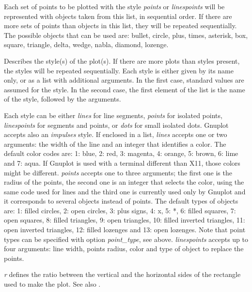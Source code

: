 \documentclass[../Maxima_Workbook.tex]{subfiles}
\begin{document}
\lz Each set of points to be plotted with the style \emph{points} or \emph{linespoints} will be represented with objects taken from this list, in sequential order. If there are more sets of points than objects in this list, they will be repeated sequentially. The possible objects that can be used are: bullet, circle, plus, times, asterisk, box, square, triangle, delta, wedge, nabla, diamond, lozenge.

\lzz {} \hfill {}

\lz Describes the style(s) of the plot(s). If there are more plots than styles present, the styles will be repeated sequentially. Each style is either given by its name only, or as a list with additional arguments. In the first case, standard values are assumed for the style. In the second case, the first element of the list is the name of the style, followed by the arguments.

\lz Each style can be either \emph{lines} for line segments, \emph{points} for isolated points, \emph{linespoints} for segments and points, or \emph{dots} for small isolated dots. Gnuplot accepts also an \emph{impulses} style. If enclosed in a list, \emph{lines} accepts one or two arguments: the width of the line and an integer that identifies a color. The default color codes are: 1: blue, 2: red, 3: magenta, 4: orange, 5: brown, 6: lime and 7: aqua. If Gnuplot is used with a terminal different than X11, those colors might be different. \emph{points} accepts one to three arguments; the first one is the radius of the points, the second one is an integer that selects the color, using the same code used for lines and the third one is currently used only by Gnuplot and it corresponds to several objects instead of points. The default types of objects are: 1: filled circles, 2: open circles, 3: plus signs, 4: x, 5: *, 6: filled squares, 7: open squares, 8: filled triangles, 9: open triangles, 10: filled inverted triangles, 11: open inverted triangles, 12: filled lozenges and 13: open lozenges. Note that point types can be specified with option \emph{point\_type}, see above. \emph{linespoints} accepts up to four arguments: line width, points radius, color and type of object to replace the points.

\lzz {} \hfill {}

\lz \emph{r} defines the ratio between the vertical and the horizontal sides of the rectangle used to make the plot. See also .
\end{document}
